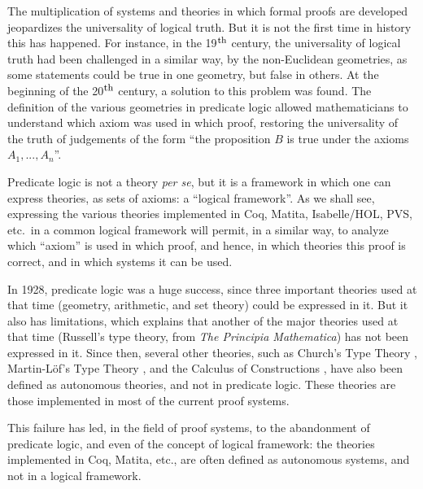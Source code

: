 
The multiplication of systems and theories in which formal proofs are
developed jeopardizes the universality of logical truth. But it is not
the first time in history this has happened.  For instance, in the
19$^{\mbox{\footnotesize th}}$ century, the universality of logical
truth had been challenged in a similar way, by the non-Euclidean
geometries, as some statements could be true in one geometry, but
false in others.  At the beginning of the 20$^{\mbox{\footnotesize
    th}}$ century, a solution to this problem was found.  The
definition of the various geometries in predicate logic
\cite{HilbertAckermann} allowed mathematicians to understand which
axiom was used in which proof, restoring the universality of the truth
of judgements of the form ``the proposition $B$ is true under the
axioms $A_1, ..., A_n$''.

Predicate logic is not a theory {\em per se}, but it is a framework in
which one can express theories, as sets of axioms: a ``logical
framework''. As we shall see, expressing the various theories
implemented in Coq, Matita, Isabelle/HOL, PVS, etc.\ in a common
logical framework will permit, in a similar way, to analyze which
``axiom'' is used in which proof, and hence, in which theories this
proof is correct, and in which systems it can be used.

In 1928, predicate logic was a huge success, since three important
theories used at that time (geometry, arithmetic, and set theory)
could be expressed in it. But it also has limitations, which explains
that another of the major theories used at that time (Russell's type
theory, from {\em The Principia Mathematica}) has not been expressed
in it. Since then, several other theories, such as Church's Type
Theory \cite{Church40}, Martin-L\"of's Type Theory
\cite{Martin-Lof84}, and the Calculus of Constructions
\cite{CoquandHuet88}, have also been defined as autonomous theories,
and not in predicate logic.  These theories are those implemented in
most of the current proof systems.

This failure has led, in the field of proof systems, to the
abandonment of predicate logic, and even of the concept of logical
framework: the theories implemented in Coq, Matita, etc., are often
defined as autonomous systems, and not in a logical framework.

